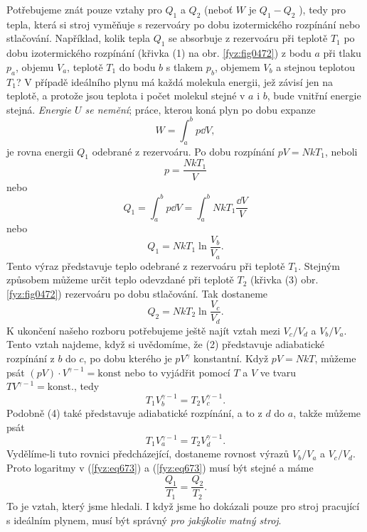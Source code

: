     Potřebujeme znát pouze vztahy pro \(Q_1\) a \(Q_2\) (neboť \(W\) je \(Q_1 - Q_2\) ), tedy pro
    tepla, která si stroj vyměňuje s rezervoáry po dobu izotermického rozpínání nebo stlačování.
    Například, kolik tepla \(Q_1\) se absorbuje z rezervoáru při teplotě \(T_1\) po dobu
    izotermického rozpínání (křivka (1) na obr. \ref{fyz:fig0472}) z bodu \(a\) při tlaku \(p_a\),
    objemu \(V_a\), teplotě \(T_1\) do bodu \(b\) s tlakem \(p_b\), objemem \(V_b\) a stejnou
    teplotou \(T_1\)? V případě ideálního plynu má každá molekula energii, jež závisí jen na
    teplotě, a protože jsou teplota i počet molekul stejné v \(a\) i \(b\), bude vnitřní energie
    stejná. \emph{Energie \(U\) se nemění}; práce, kterou koná plyn po dobu expanze 
    \begin{equation*}
      W=∫^b_ap\dd{V},
    \end{equation*}
    je rovna energii \(Q_1\) odebrané z rezervoáru. Po dobu rozpínání \(pV= NkT_1\), neboli
    \begin{equation}\label{fyz:eq671}
      p=\frac{NkT_1}{V}
    \end{equation}
    nebo
    \begin{equation}\label{fyz:eq672}
      Q_1=∫^b_ap\dd{V}=∫^b_aNkT_1\frac{\dd{V}}{V}
    \end{equation}
    nebo
    \begin{equation}\label{fyz:eq673}
      Q_1=NkT_1\ln\frac{V_b}{V_a}.
    \end{equation}
    Tento výraz představuje teplo odebrané z rezervoáru při teplotě \(T_1\). Stejným způsobem můžeme
    určit teplo odevzdané při teplotě \(T_2\) (křivka (3) obr. \ref{fyz:fig0472}) rezervoáru po dobu
    stlačování. Tak dostaneme
    \begin{equation}\label{fyz:eq674}
      Q_2=NkT_2\ln\frac{V_c}{V_d}.
    \end{equation}
    K ukončení našeho rozboru potřebujeme ještě najít vztah mezi \(V_c/V_d\) a \(V_b/V_a\). Tento
    vztah najdeme, když si uvědomíme, že (2) představuje adiabatické rozpínání z \(b\) do \(c\), po
    dobu kterého je \(pV^\gamma\) konstantní. Když \(pV= NkT\), můžeme psát \((pV)\cdot V^{\gamma
    -1} = \text{konst}\) nebo to vyjádřit pomocí \(T\) a \(V\) ve tvaru \(TV^{\gamma - 1} =
    \text{konst.}\), tedy
    \begin{equation}\label{fyz:eq675}
      T_1V^{γ−1}_b=T_2V^{γ−1}_c.
    \end{equation}
    Podobně (4) také představuje adiabatické rozpínání, a to z \(d\) do \(a\), takže můžeme psát
    \begin{equation}\label{fyz:eq676}
      T_1V^{γ−1}_a=T_2V^{γ−1}_d.
    \end{equation}
    Vydělíme-li tuto rovnici předcházející, dostaneme rovnost výrazů \(V_b/V_a\) a \(V_c/V_d\).
    Proto logaritmy v (\ref{fyz:eq673}) a (\ref{fyz:eq673}) musí být stejné a máme
    \begin{equation}\label{fyz:eq677}
      \frac{Q_1}{T_1}=\frac{Q_2}{T_2}.
    \end{equation}
    To je vztah, který jsme hledali. I když jsme ho dokázali pouze pro stroj pracující s ideálním
    plynem, musí být správný \emph{pro jakýkoliv matný stroj}.

